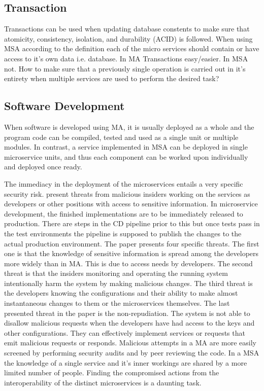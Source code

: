 \subsection{Transaction}
\begin{sloppypar}
    Transactions can be used when updating database constents to make sure that
    atomicity, consistency, isolation, and durability (ACID) \citep{acid} is 
    followed. When using MSA according to the definition each of the micro 
    services should contain or have access to it's own data i.e. database. 
    In MA Transactions easy/easier. In MSA not. How to make sure that a 
    previously single operation is carried out in it's entirety when multiple 
    services are used to perform the desired task?
\end{sloppypar}

\subsection{Software Development}
\begin{sloppypar}
    When software is developed using MA, it is usually deployed as a whole and 
    the program code can be compiled, tested and used as a single unit or 
    multiple modules. In contrast, a service implemented in MSA 
    can be deployed in single microservice units, and thus each component can 
    be worked upon individually and deployed once ready. 
\end{sloppypar}
\begin{sloppypar}
    The immediacy in the deployment of the microservices entails a very specific 
    security risk. \citet{integinside} present threats from malicious insiders 
    working on the services as developers or other positions with access to 
    sensitive information. In microservice development, the finished 
    implementations are to be immediately released to production. There are 
    steps in the CD pipeline prior to this but once tests pass in the test 
    environments the pipeline is supposed to publish the changes to the actual 
    production environment. The paper presents four specific threats. The first 
    one is that the knowledge of sensitive information is spread among the 
    developers more widely than in MA. This is due to access needs by 
    developers. The second threat is that the insiders monitoring and operating 
    the running system intentionally harm the system by making malicious 
    changes. The third threat is the developers knowing the configurations and 
    their ability to make almost instantaneous changes to them or the 
    microservices themselves. The last presented threat in the paper is the 
    non-repudiation. The system is not able to disallow malicious requests when 
    the developers have had access to the keys and other configurations. They 
    can effectively implement services or requests that emit malicious requests 
    or responds. Malicious attempts in a MA are more easily screened by 
    performing security audits and by peer reviewing the code. In a MSA the 
    knowledge of a single service and it’s inner workings are shared by a more 
    limited number of people. Finding the compromised actions from the 
    interoperability of the distinct microservices is a daunting task.
\end{sloppypar}
